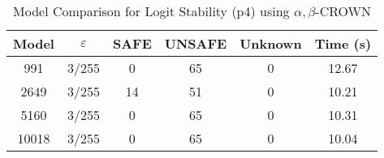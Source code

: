 \begin{table}[htbp]
\centering
\caption{Model Comparison for Logit Stability (p4) using $\alpha,\beta$-CROWN}
\label{tab:p4_abcrown_model_comparison}
\begin{tabular}{|c|c|c|c|c|c|}
\hline
Model & $\varepsilon$ & SAFE & UNSAFE & Unknown & Time (s) \\ \hline
991 & 3/255 & 0 & 65 & 0 & 12.67 \\ \hline
2649 & 3/255 & 14 & 51 & 0 & 10.21 \\ \hline
5160 & 3/255 & 0 & 65 & 0 & 10.31 \\ \hline
10018 & 3/255 & 0 & 65 & 0 & 10.04 \\ \hline
\end{tabular}
\end{table}
